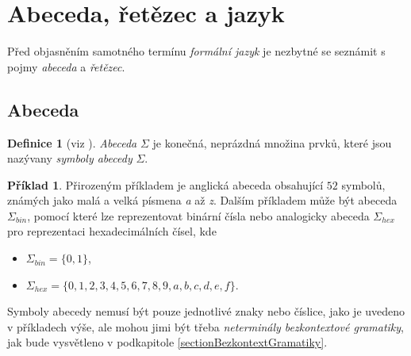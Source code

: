 

\theoremstyle{definition}
\newtheorem{definice}{Definice}[chapter]
\newtheorem{priklad}{Příklad}[chapter]
\newtheorem{konvence}{Konvence}[chapter]
\newtheorem{notace}{Notace}[chapter]



\section{Abeceda, řetězec a jazyk}
Před objasněním samotného termínu \emph{formální jazyk} je nezbytné se seznámit s pojmy \emph{abeceda} a \emph{řetězec}.

\subsection*{Abeceda}
\begin{definice}[viz \cite{Meduna:2014:FormalLanguagesAndComputation}]
  \emph{Abeceda} $\Sigma$ je konečná, neprázdná množina prvků, které jsou nazývany \emph{symboly abecedy} $\Sigma$.
\end{definice}

\begin{priklad} \label{prikladAbeceda}
  Přirozeným příkladem je anglická abeceda obsahující $52$ symbolů, známých jako malá a velká písmena \emph{a} až \emph{z}. Dalším příkladem může být
  abeceda $\Sigma_{bin}$, pomocí které lze reprezentovat binární čísla nebo analogicky abeceda $\Sigma_{hex}$ pro reprezentaci hexadecimálních čísel, kde
  \begin{itemize}
    \item $\Sigma_{bin} = \{0, 1\}$,
    \item $\Sigma_{hex} = \{0, 1, 2, 3, 4, 5, 6, 7, 8, 9, a, b, c, d, e, f\}$.
  \end{itemize}
  Symboly abecedy nemusí být pouze jednotlivé znaky nebo číslice, jako je uvedeno v příkladech výše, ale mohou jimi být třeba \emph{neterminály bezkontextové gramatiky}, jak bude
  vysvětleno v podkapitole \ref{sectionBezkontextGramatiky}.
\end{priklad}

